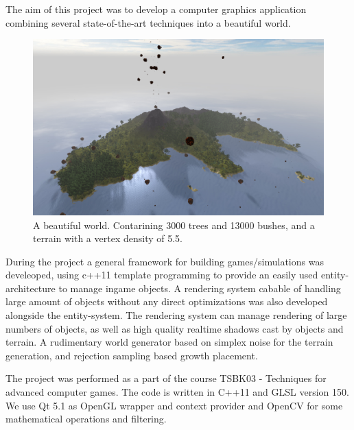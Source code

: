 The aim of this project was to develop a computer graphics application combining several state-of-the-art techniques into a beautiful world.
\begin{figure}[H]
  \centering
  \includegraphics[width=1.0\linewidth]{images/frontImage.jpg}
  \caption[A beautiful world.]{A beautiful world. Contarining 3000 trees and 13000 bushes, and a terrain with a vertex density of 5.5.}
  \label{fig:beautifulIsland}
\end{figure}%

During the project a general framework for building games/simulations was develeoped, using c++11 template programming to provide an easily used entity-architecture to manage ingame objects. A rendering system cabable of handling large amount of objects without any direct optimizations was also developed alongside the entity-system. The rendering system can manage rendering of large numbers of objects, as well as high quality realtime shadows cast by objects and terrain. A rudimentary world generator based on simplex noise for the terrain generation, and rejection sampling based growth placement.


The project was performed as a part of the course TSBK03 - Techniques for advanced computer games. The code is written in C++11 and GLSL version 150. We use Qt 5.1 as OpenGL wrapper and context provider and OpenCV for some mathematical operations and filtering.